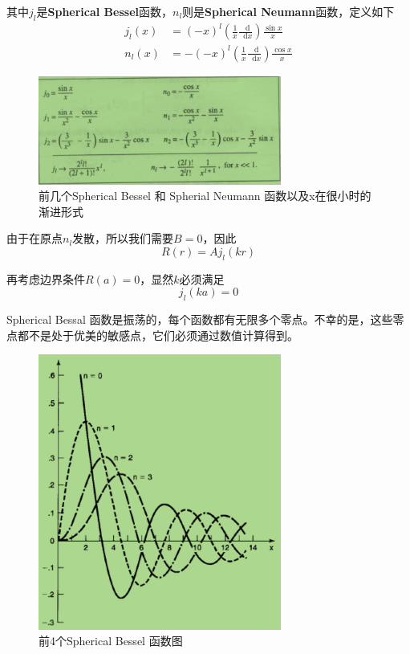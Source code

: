 \documentclass[UTF8]{ctexart}
\begin{document}
\noindent 其中$j_l$是\textbf{Spherical Bessel}函数，$n_l$则是\textbf{Spherical Neumann}函数，定义如下
\begin{equation}
    \begin{aligned}
        j_l(x) &= (-x)^l \left(\frac{1}{x}\frac{\mathop{}\!\mathrm{d} }{\mathop{}\!\mathrm{d} x}\right)\frac{\sin x}{x} \\
        n_l(x) &= -(-x)^l \left(\frac{1}{x}\frac{\mathop{}\!\mathrm{d} }{\mathop{}\!\mathrm{d} x}\right)\frac{\cos x}{x} 
    \end{aligned}
\end{equation}

    \begin{figure}[htb]
        \centering
        \includegraphics[width=8cm]{figure4-3.png}
        \caption{前几个Spherical Bessel 和 Spherial Neumann 函数以及x在很小时的渐进形式}
        \label{figure4.3}
    \end{figure}

    由于在原点$n_l$发散，所以我们需要$B=0$，因此
    \begin{equation}
        R(r) = Aj_l(kr)
    \end{equation}

\noindent 再考虑边界条件$R(a) = 0$，显然$k$必须满足
\begin{equation}
    j_l(ka) = 0
\end{equation}

\noindent Spherical Bessal 函数是振荡的，每个函数都有无限多个零点。不幸的是，这些零点都不是处于优美的敏感点，它们必须通过数值计算得到。
\begin{figure}[htb]
    \centering
    \includegraphics[width=8cm]{figure4-4.png}
    \caption{前4个Spherical Bessel 函数图}
    \label{figure4.4}
\end{figure}
\end{document}
